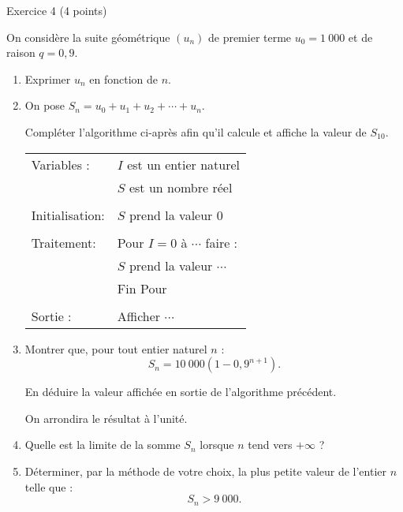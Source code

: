 
%
\begin{h2}Exercice 4 (4 points)\end{h2}
\par
On considère la suite géométrique $(u_n)$ de premier terme ${u_0= 1~000}$ et de raison ${q=0,9}$.
\par
\begin{enumerate}
     \item
     Exprimer $u_n$ en fonction de $n$.
     \item
     On pose $S_n=u_0+u_1+u_2+ \cdots +u_n$.
     \par
     Compléter l'algorithme ci-après afin qu'il calcule et affiche la valeur de $S_{10}$.
     \par
     \begin{center}
          \begin{extern}%
               \begin{tabular}{|l l|}\hline
                    Variables :	&$I$ est un entier naturel\\
                    &$S$ est un nombre réel\\
                    & \\
                    Initialisation: &$S$ prend la valeur 0\\
                    & \\
                    Traitement: &Pour $I=0$ à $\cdots$ faire :\\
                    &\qquad$S$ prend la valeur $\cdots$\\
                    &Fin Pour\\
                    & \\
                    Sortie :	&Afficher $\cdots$ \\
                    \hline
               \end{tabular}
          \end{extern}
     \end{center}
     \item
     Montrer que, pour tout entier naturel $n$ :
     \[ S_n=10~000 \left( 1-0,9^{n+1} \right). \]
     \par
     En déduire la valeur affichée en sortie de l'algorithme précédent.
     \par
     On arrondira le résultat à l'unité.
     \item
     Quelle est la limite de la somme $S_n$ lorsque $n$ tend vers $+\infty$ ?
     \item
     Déterminer, par la méthode de votre choix, la plus petite valeur de l'entier $n$ telle que :
     \[ S_n > 9~000. \]
     \par
\end{enumerate}
